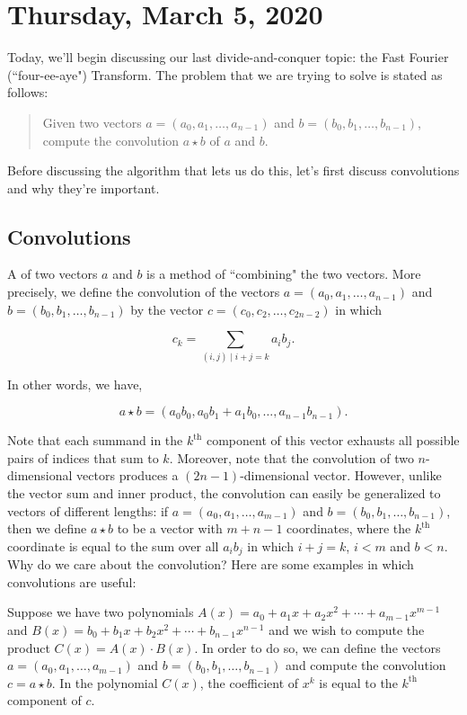 \newpage
\section{Thursday, March 5, 2020}

Today, we'll begin discussing our last divide-and-conquer topic: the Fast Fourier (``four-ee-aye") Transform. The problem that we are trying to solve is stated as follows:

\begin{quote}
    Given two vectors $a = (a_0, a_1, \ldots, a_{n - 1})$ and $b = (b_0, b_1, \ldots, b_{n - 1})$, compute the convolution $a\star b$ of $a$ and $b$. 
\end{quote}

Before discussing the algorithm that lets us do this, let's first discuss convolutions and why they're important. 

\subsection{Convolutions}

A  of two vectors $a$ and $b$ is a method of ``combining" the two vectors. More precisely, we define the convolution of the vectors $a = (a_0, a_1, \ldots, a_{n - 1})$ and $b = (b_0, b_1, \ldots, b_{n - 1})$ by the vector $c = (c_0, c_2, \ldots, c_{2n - 2})$ in which

\[
c_k = \sum_{(i, j) \mid i + j = k} a_i b_j.
\]

In other words, we have,

\[
a\star b = (a_0b_0, a_0b_1 + a_1b_0, \ldots, a_{n-1}b_{n-1}).
\]

Note that each summand in the $k^{\text{th}}$ component of this vector exhausts all possible pairs of indices that sum to $k$. Moreover, note that the convolution of two $n$-dimensional vectors produces a $(2n - 1)$-dimensional vector. However, unlike the vector sum and inner product, the convolution can easily be generalized to vectors of different lengths: if $a = (a_0, a_1, \ldots, a_{m - 1})$ and $b = (b_0, b_1, \ldots, b_{n - 1})$, then we define $a \star b$ to be a vector with $m + n - 1$ coordinates, where the $k^{\text{th}}$ coordinate is equal to the sum over all $a_ib_j$ in which $i + j = k$, $i < m$ and $b < n$. \\[1em]


Why do we care about the convolution? Here are some examples in which convolutions are useful:

\begin{example}
Suppose we have two polynomials $A(x) = a_0 + a_1x + a_2x^2 + \cdots + a_{m - 1}x^{m - 1}$ and $B(x) = b_0 + b_1x + b_2x^2 + \cdots + b_{n - 1}x^{n - 1}$ and we wish to compute the product $C(x) = A(x) \cdot B(x)$. In order to do so, we can define the vectors $a = (a_0, a_1, \ldots, a_{m - 1})$ and $b = (b_0, b_1, \ldots, b_{n - 1})$ and compute the convolution $c = a\star b$. In the polynomial $C(x)$, the coefficient of $x^{k}$ is equal to the $k^{\text{th}}$ component of $c$.
\end{example}


